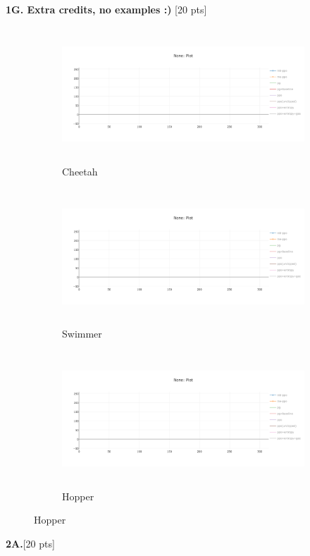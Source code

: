 \documentclass[10pt]{article}
\begin{document}
\clearpage
\textbf{1G. Extra credits, no examples :)} [20 pts]
\begin{figure}[ht!]
    \centering
    \begin{subfigure}[h]{0.6\linewidth}
        \centering
        \includegraphics[height=2in]{figures/newplot.png}
        \caption{Cheetah}
    \end{subfigure}
    \vskip 0.3in
    \begin{subfigure}[h]{0.6\textwidth}
        \centering
        \includegraphics[height=2in]{figures/newplot.png}
        \caption{Swimmer}
    \end{subfigure}
    \vskip 0.3in
    \begin{subfigure}[h]{0.6\textwidth}
        \centering
        \includegraphics[height=2in]{figures/newplot.png}
        \caption{Hopper}
    \end{subfigure}
\end{figure}
\clearpage
\textbf{2A.}[20 pts]
\end{document}
